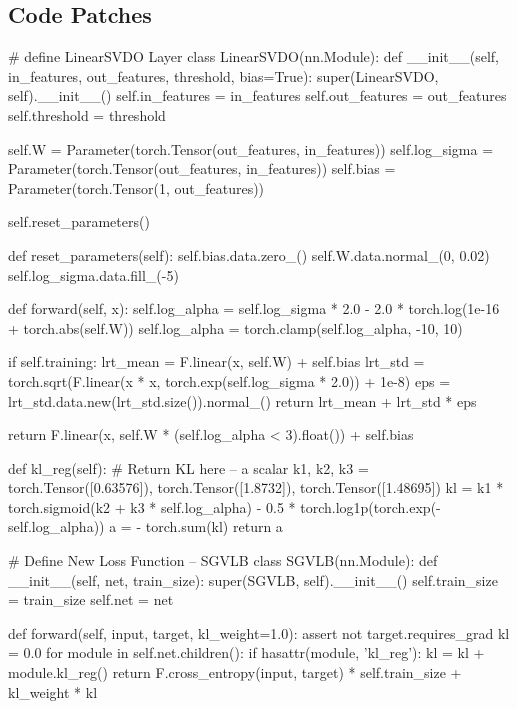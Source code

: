 \documentclass{article}
\begin{document}
\clearpage

\appendixpage

\begin{appendices}
	\section{Code Patches}
		\begin{python}
# define LinearSVDO Layer
class LinearSVDO(nn.Module):
    def __init__(self, in_features, out_features, threshold, bias=True):
        super(LinearSVDO, self).__init__()
        self.in_features = in_features
        self.out_features = out_features
        self.threshold = threshold

        self.W = Parameter(torch.Tensor(out_features, in_features))
        self.log_sigma = Parameter(torch.Tensor(out_features, in_features))
        self.bias = Parameter(torch.Tensor(1, out_features))
        
        self.reset_parameters()

    def reset_parameters(self):
        self.bias.data.zero_()
        self.W.data.normal_(0, 0.02)
        self.log_sigma.data.fill_(-5)        
        
    def forward(self, x):
        self.log_alpha = self.log_sigma * 2.0 - 2.0 * torch.log(1e-16 + torch.abs(self.W))
        self.log_alpha = torch.clamp(self.log_alpha, -10, 10) 
        
        if self.training:
            lrt_mean =  F.linear(x, self.W) + self.bias
            lrt_std = torch.sqrt(F.linear(x * x, torch.exp(self.log_sigma * 2.0)) + 1e-8)
            eps = lrt_std.data.new(lrt_std.size()).normal_()
            return lrt_mean + lrt_std * eps
    
        return F.linear(x, self.W * (self.log_alpha < 3).float()) + self.bias
        
    def kl_reg(self):
        # Return KL here -- a scalar 
        k1, k2, k3 = torch.Tensor([0.63576]), torch.Tensor([1.8732]), torch.Tensor([1.48695])
        kl = k1 * torch.sigmoid(k2 + k3 * self.log_alpha) - 0.5 * torch.log1p(torch.exp(-self.log_alpha))
        a = - torch.sum(kl)
        return a
        \end{python}

\clearpage

        \begin{python}
# Define New Loss Function -- SGVLB 
class SGVLB(nn.Module):
    def __init__(self, net, train_size):
        super(SGVLB, self).__init__()
        self.train_size = train_size
        self.net = net

    def forward(self, input, target, kl_weight=1.0):
        assert not target.requires_grad
        kl = 0.0
        for module in self.net.children():
            if hasattr(module, 'kl_reg'):
                kl = kl + module.kl_reg()
        return F.cross_entropy(input, target) * self.train_size + kl_weight * kl
		\end{python}

\end{appendices}
\end{document}
